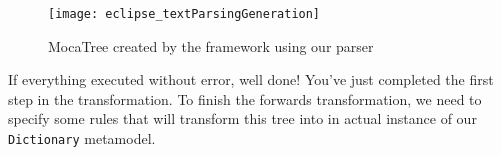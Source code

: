 \vspace{0.5cm}

\begin{figure}[!htbp]
\begin{center}
 \texttt{[image: eclipse\_textParsingGeneration]}
  \caption{MocaTree created by the framework using our parser}
  \label{eclipse:treeResult}
\end{center}
\end{figure}

\vspace{0.5cm}

If everything executed without error, well done! You've just completed the first step in the transformation. To finish the forwards transformation, we need to
specify some rules that will transform this tree into in actual instance of our \texttt{Dictionary} metamodel.
